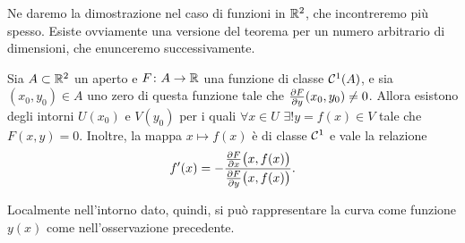 Ne daremo la dimostrazione nel caso di funzioni in $\mathbb{R}^2$, che incontreremo più spesso.
Esiste ovviamente una versione del teorema per un numero arbitrario di dimensioni, che enunceremo successivamente.
\begin{teorema}[di Dini] \label{t:dini-R2}
	Sia $A\subset\mathbb{R}^2$ un aperto e $F\colon A\to\mathbb{R}$ una funzione di classe $\mathcal{C}^{{1}}(A)$, e sia $(x_0,y_0)\in A$ uno zero di questa funzione tale che $\frac{\partial {F}}{\partial {y}}(x_0,y_0)\neq 0$.
	Allora esistono degli intorni $U(x_0)$ e $V(y_0)$ per i quali $\forall x\in U$ $\exists! y=f(x)\in V$ tale che $F(x,y)=0$. Inoltre, la mappa $x\mapsto f(x)$ è di classe $\mathcal{C}^{{1}}$ e vale la relazione
	\begin{equation}
		f'(x)=-\dfrac{\frac{\partial {F}}{\partial {x}}\big(x,f(x)\big)}{\frac{\partial {F}}{\partial {y}}\big(x,f(x)\big)}.
		\label{eq:dini-R2}
	\end{equation}
\end{teorema}
Localmente nell'intorno dato, quindi, si può rappresentare la curva come funzione $y(x)$ come nell'osservazione precedente.

